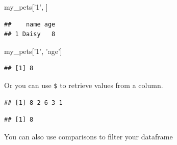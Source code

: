 \documentclass[
]{book}
\newenvironment{Shaded}{\begin{snugshade}}{\end{snugshade}}
\newcommand{\CommentTok}[1]{\textcolor[rgb]{0.56,0.35,0.01}{\textit{#1}}}
\newcommand{\DecValTok}[1]{\textcolor[rgb]{0.00,0.00,0.81}{#1}}
\newcommand{\KeywordTok}[1]{\textcolor[rgb]{0.13,0.29,0.53}{\textbf{#1}}}
\newcommand{\NormalTok}[1]{#1}
\newcommand{\OperatorTok}[1]{\textcolor[rgb]{0.81,0.36,0.00}{\textbf{#1}}}
\newcommand{\StringTok}[1]{\textcolor[rgb]{0.31,0.60,0.02}{#1}}
\begin{document}
\begin{Shaded}
\begin{Highlighting}[]
\NormalTok{my_pets[}\StringTok{'1'}\NormalTok{, ]}
\end{Highlighting}
\end{Shaded}

\begin{verbatim}
##    name age
## 1 Daisy   8
\end{verbatim}

\begin{Shaded}
\begin{Highlighting}[]
\NormalTok{my_pets[}\StringTok{'1'}\NormalTok{, }\StringTok{'age'}\NormalTok{]}
\end{Highlighting}
\end{Shaded}

\begin{verbatim}
## [1] 8
\end{verbatim}

Or you can use \texttt{\$} to retrieve values from a column.

\begin{Shaded}
\end{Shaded}

\begin{verbatim}
## [1] 8 2 6 3 1
\end{verbatim}

\begin{Shaded}
\end{Shaded}

\begin{verbatim}
## [1] 8
\end{verbatim}

You can also use comparisons to filter your dataframe

\begin{Shaded}
\end{Shaded}
\end{document}
